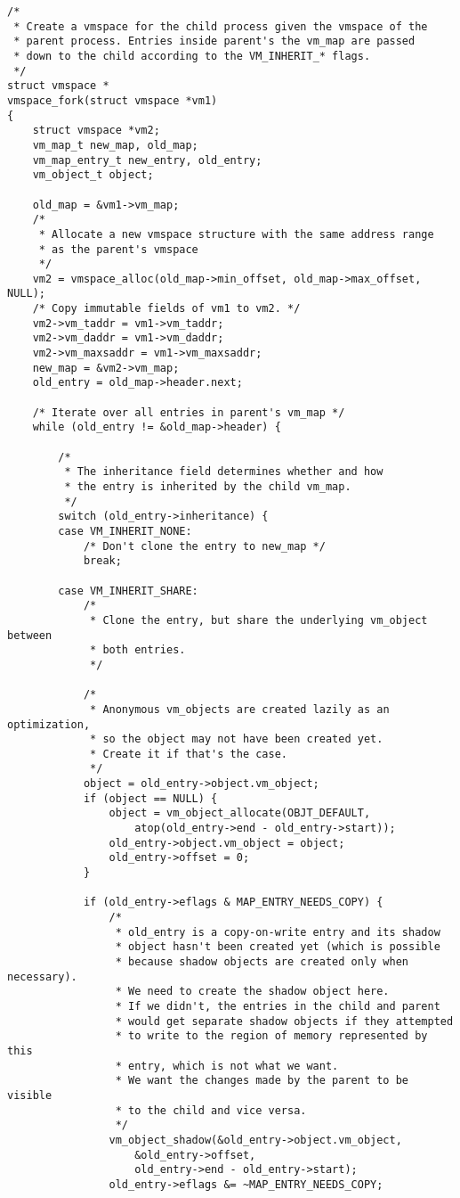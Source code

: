\documentclass[shortabstract, english]{iithesis}
\newenvironment{code}{}{}
\begin{document}
\begin{code}
\begin{verbatim}
/*
 * Create a vmspace for the child process given the vmspace of the
 * parent process. Entries inside parent's the vm_map are passed
 * down to the child according to the VM_INHERIT_* flags.
 */
struct vmspace *
vmspace_fork(struct vmspace *vm1)
{
    struct vmspace *vm2;
    vm_map_t new_map, old_map;
    vm_map_entry_t new_entry, old_entry;
    vm_object_t object;

    old_map = &vm1->vm_map;
    /*
     * Allocate a new vmspace structure with the same address range
     * as the parent's vmspace
     */
    vm2 = vmspace_alloc(old_map->min_offset, old_map->max_offset, NULL);
    /* Copy immutable fields of vm1 to vm2. */
    vm2->vm_taddr = vm1->vm_taddr;
    vm2->vm_daddr = vm1->vm_daddr;
    vm2->vm_maxsaddr = vm1->vm_maxsaddr;
    new_map = &vm2->vm_map;
    old_entry = old_map->header.next;

    /* Iterate over all entries in parent's vm_map */
    while (old_entry != &old_map->header) {

        /*
         * The inheritance field determines whether and how
         * the entry is inherited by the child vm_map.
         */
        switch (old_entry->inheritance) {
        case VM_INHERIT_NONE:
            /* Don't clone the entry to new_map */
            break;

        case VM_INHERIT_SHARE:
            /*
             * Clone the entry, but share the underlying vm_object between
             * both entries.
             */

            /*
             * Anonymous vm_objects are created lazily as an optimization,
             * so the object may not have been created yet.
             * Create it if that's the case.
             */
            object = old_entry->object.vm_object;
            if (object == NULL) {
                object = vm_object_allocate(OBJT_DEFAULT,
                    atop(old_entry->end - old_entry->start));
                old_entry->object.vm_object = object;
                old_entry->offset = 0;
            }

            if (old_entry->eflags & MAP_ENTRY_NEEDS_COPY) {
                /*
                 * old_entry is a copy-on-write entry and its shadow
                 * object hasn't been created yet (which is possible
                 * because shadow objects are created only when necessary).
                 * We need to create the shadow object here.
                 * If we didn't, the entries in the child and parent
                 * would get separate shadow objects if they attempted
                 * to write to the region of memory represented by this
                 * entry, which is not what we want.
                 * We want the changes made by the parent to be visible
                 * to the child and vice versa.
                 */
                vm_object_shadow(&old_entry->object.vm_object,
                    &old_entry->offset,
                    old_entry->end - old_entry->start);
                old_entry->eflags &= ~MAP_ENTRY_NEEDS_COPY;


\end{verbatim}
\end{code}
\end{document}
